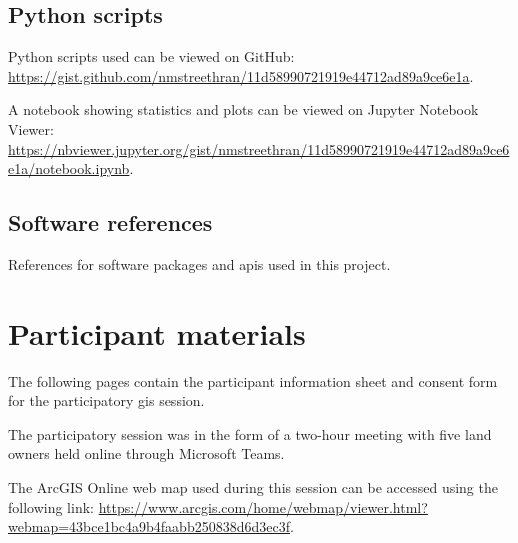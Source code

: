 \section*{Python scripts}

Python scripts used can be viewed on GitHub:
\url{https://gist.github.com/nmstreethran/11d58990721919e44712ad89a9ce6e1a}.

A notebook showing statistics and plots can be viewed on Jupyter Notebook
Viewer:
\url{https://nbviewer.jupyter.org/gist/nmstreethran/11d58990721919e44712ad89a9ce6e1a/notebook.ipynb}.

\section*{Software references}

References for software packages and \glspl{api} used in this project.

\printbibliography[notcategory=cited,heading=none,keyword=software]

\chapter{Participant materials \label{app:pgis}}

The following pages contain the participant information sheet and consent form for the participatory \gls{gis} session.

The participatory session was in the form of a two-hour meeting with five land owners held online through Microsoft Teams.

The ArcGIS Online web map used during this session can be accessed using the following link:
\url{https://www.arcgis.com/home/webmap/viewer.html?webmap=43bce1bc4a9b4faabb250838d6d3ec3f}.

\newpage

